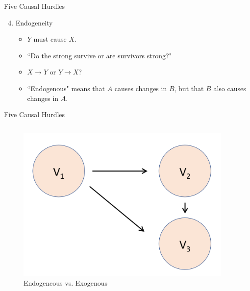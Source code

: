 \documentclass[xcolor=dvipsnames]{beamer}
\begin{document}
	\begin{frame}[fragile]{Five Causal Hurdles}
	\begin{enumerate}
	\setcounter{enumi}{3}
	  \item Endogeneity \pause
	  \begin{itemize}
	    \item $Y$ must cause $X$.
	    \item ``Do the strong survive or are survivors strong?"
	    \item $X \rightarrow Y$ or $Y \rightarrow X$?
	    \item ``Endogenous" means that $A$ causes changes in $B$, but that $B$ also causes changes in $A$.
	  \end{itemize} 
	\end{enumerate}
  \end{frame}

	\begin{frame}[fragile]{Five Causal Hurdles}
	
		\begin{columns}[T]
			\begin{column}{0.6\textwidth}
				\begin{figure}
	        \centering
	        \includegraphics[width=0.8\linewidth]{endogeneity.png}
        	\caption{Endogeneous vs. Exogenous}
	        \label{fig2}
	      \end{figure}
			\end{column}
			
			\begin{column}{0.36\textwidth}
			\end{column}
		\end{columns}
	\end{frame}
\end{document}
